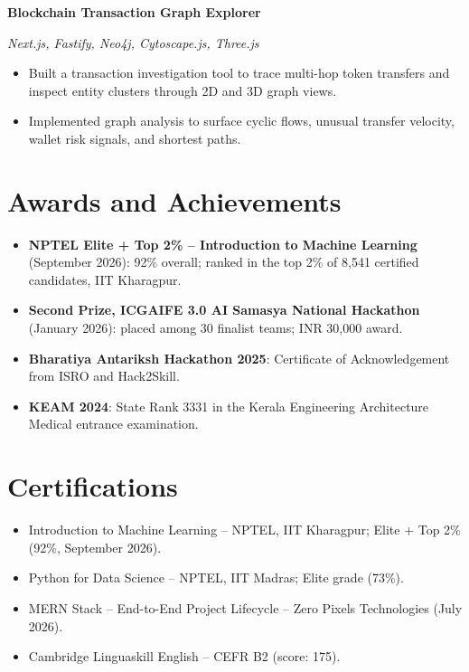 \documentclass[a4paper,10pt]{article}
\newcommand{\project}[3]{%
  \noindent\textbf{#1}\hfill{\small #2}\par
  {\small\emph{#3}}\par\vspace{-2pt}%
}
\begin{document}
\project{Blockchain Transaction Graph Explorer}{}{Next.js, Fastify, Neo4j, Cytoscape.js, Three.js}
\begin{itemize}
  \item Built a transaction investigation tool to trace multi-hop token transfers and inspect entity clusters through 2D and 3D graph views.
  \item Implemented graph analysis to surface cyclic flows, unusual transfer velocity, wallet risk signals, and shortest paths.
\end{itemize}

\section{Awards and Achievements}
\begin{itemize}
  \item \textbf{NPTEL Elite + Top 2\% -- Introduction to Machine Learning} (September 2026): 92\% overall; ranked in the top 2\% of 8,541 certified candidates, IIT Kharagpur.
  \item \textbf{Second Prize, ICGAIFE 3.0 AI Samasya National Hackathon} (January 2026): placed among 30 finalist teams; INR 30,000 award.
  \item \textbf{Bharatiya Antariksh Hackathon 2025}: Certificate of Acknowledgement from ISRO and Hack2Skill.
  \item \textbf{KEAM 2024}: State Rank 3331 in the Kerala Engineering Architecture Medical entrance examination.
\end{itemize}

\section{Certifications}
\begin{itemize}
  \item Introduction to Machine Learning -- NPTEL, IIT Kharagpur; Elite + Top 2\% (92\%, September 2026).
  \item Python for Data Science -- NPTEL, IIT Madras; Elite grade (73\%).
  \item MERN Stack -- End-to-End Project Lifecycle -- Zero Pixels Technologies (July 2026).
  \item Cambridge Linguaskill English -- CEFR B2 (score: 175).
\end{itemize}
\end{document}
